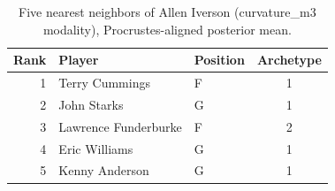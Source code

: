 \begin{table}[htbp]
  \centering\small
  \begin{tabular}{rllc}
    \toprule
    Rank & Player & Position & Archetype \\
    \midrule
    1 & Terry Cummings & F & 1 \\
    2 & John Starks & G & 1 \\
    3 & Lawrence Funderburke & F & 2 \\
    4 & Eric Williams & G & 1 \\
    5 & Kenny Anderson & G & 1 \\
    \bottomrule
  \end{tabular}
  \caption{Five nearest neighbors of Allen Iverson (curvature_m3 modality), Procrustes-aligned posterior mean.}
  \label{tab:Allen_Iverson_neighbors_curvature_m3}
\end{table}

